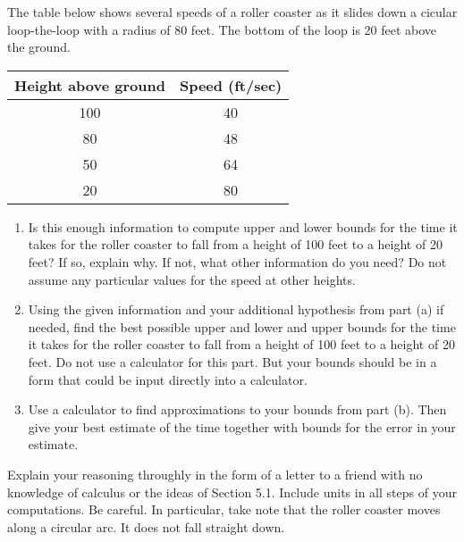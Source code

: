 \documentclass{ximera}
\begin{document}
\begin{exercise}  \label{EXKjdDMFne3}

The table below shows several speeds of a roller coaster as it slides down a cicular loop-the-loop with a radius of 80 feet. The bottom of the loop is 20 feet above the ground. 

\begin{tabular}{|c|c|}
\hline
Height above ground & Speed (ft/sec) \\
\hline
100 & 40 \\  \hline
80 & 48 \\ \hline
50 & 64 \\ \hline
20 & 80 \\
\hline
\end{tabular}

\begin{enumerate}
\item Is this enough information to compute upper and lower bounds for the time it takes for the roller coaster to fall from a height of 100 feet to a height of 20 feet? If so, explain why. If not, what other information do you need? Do not assume any particular values for the speed at other heights.

\item Using the given information and your additional hypothesis from part (a) if needed, find the best possible upper and lower and upper bounds for the time it takes for the roller coaster to fall from a height of 100 feet to a height of 20 feet. Do not use a calculator for this part. But your bounds should be in a form that could be input directly into a calculator.

\item Use a calculator to find approximations to your bounds from part (b). Then give your best estimate of the time together with bounds for the error in your estimate.

\end{enumerate}

Explain your reasoning throughly in the form of a letter to a friend with no knowledge of calculus or the ideas of Section 5.1. Include units in all steps of your computations. Be careful. In particular, take note that the roller coaster moves along a circular arc. It does not fall straight down.

\end{exercise}
\end{document}
